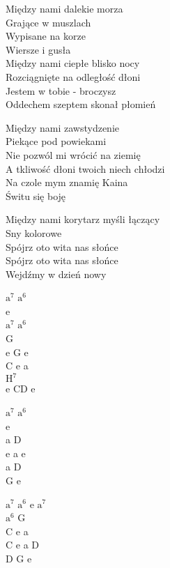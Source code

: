 \begin{text}
    Między nami dalekie morza\\
    Grające w muszlach\\
    Wypisane na korze\\
    Wiersze i gusła\\
    Między nami ciepłe blisko nocy\\
    Rozciągnięte na odległość dłoni\\
    Jestem w tobie - broczysz\\
    Oddechem szeptem skonał płomień

    Między nami zawstydzenie\\
    Piekące pod powiekami\\
    Nie pozwól mi wrócić na ziemię\\
    A tkliwość dłoni twoich niech chłodzi\\
    Na czole mym znamię Kaina\\
    Świtu się boję

    Między nami korytarz myśli łączący\\
    Sny kolorowe\\
    Spójrz oto wita nas słońce\\
    Spójrz oto wita nas słońce\\
    Wejdźmy w dzień nowy
\end{text}
\begin{chord}
    $\mathrm{a^7}$ $\mathrm{a^6}$\\
    e\\
    $\mathrm{a^7}$ $\mathrm{a^6}$\\
    G\\
    e G e\\
    C e a\\
    $\mathrm{H^7}$\\
    e CD e

    $\mathrm{a^7}$ $\mathrm{a^6}$\\
    e\\
    a D\\
    e a e\\
    a D\\
    G e

    $\mathrm{a^7}$ $\mathrm{a^6}$ e $\mathrm{a^7}$\\
    $\mathrm{a^6}$ G\\
    C e a\\
    C e a D\\
    D G e


\end{chord}
